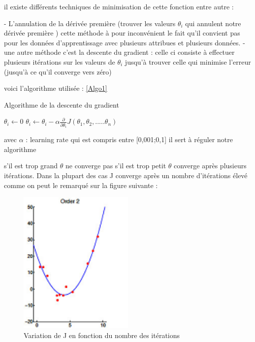  il existe différents techniques de minimisation de cette fonction entre autre :
 
  - L'annulation de la dérivée première (trouver les valeurs ${\theta }_{i}$ qui annulent notre dérivée première  )   cette méthode à pour inconvénient le fait qu'il convient pas pour les données d'apprentissage avec plusieurs attribues et plusieurs données. 
  - une autre méthode c'est la descente du gradient :
  celle ci consiste à effectuer plusieurs itérations sur les valeurs de  ${\theta }_{i}$ jusqu'à trouver celle qui minimise l'erreur (jusqu'à ce qu'il converge vers zéro)
  
  voici l'algorithme utilisée :
\ref{Algo1}
\begin{algorithm}[ht]
	\caption{Algorithme de la descente du gradient }
	\label{Algo1}
	\begin{algorithmic}
		\State ${\theta }_{i} \leftarrow 0$
		\State ${\theta }_{i} \leftarrow  {\theta }_{i} - \alpha \frac{\partial }{\partial {{\theta }_{i}}}J\left({\theta }_{1},{\theta }_{2},.....{\theta }_{n}\right)$
		\EndWhile
	\end{algorithmic}
   \end{algorithm}
  
  avec $\alpha$ : learning rate qui est compris entre [0,001;0,1] il sert à réguler notre algorithme
  
  s'il est trop grand $\theta$ ne converge pas
  s'il est trop petit $\theta$ converge après plusieurs itérations. 
  Dans la plupart des cas J converge après un nombre d'itérations élevé
  comme on peut le remarqué sur la figure suivante :
  \begin{figure}[ht]
  	\centering
  	\includegraphics[width=0.5\textwidth]{fig/regressionPlokynome.png}
  	\caption[Short caption]{Variation de J en fonction du nombre des itérations}
  	\label{fig:imageGraph}
  \end{figure}
   
